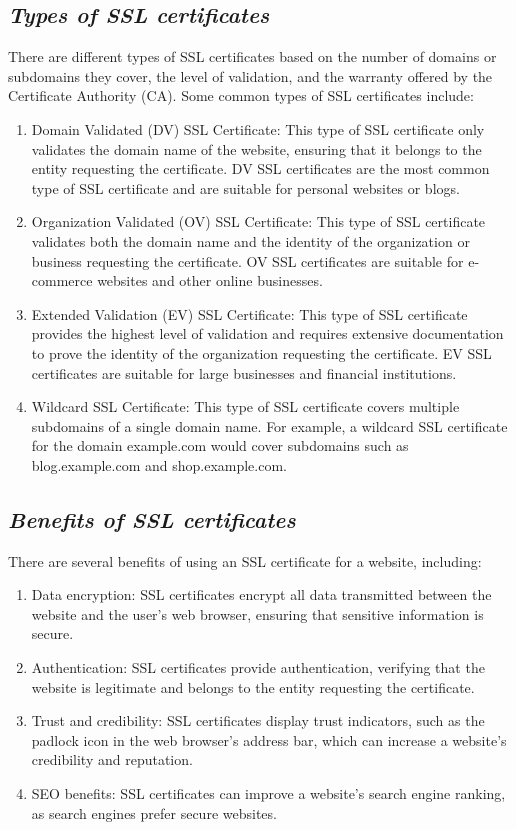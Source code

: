 \documentclass{article}
\begin{document}
\subsection{\textit{Types of SSL certificates}}
There are different types of SSL certificates based on the number of domains or subdomains they cover, the level of validation, and the warranty offered by the Certificate Authority (CA). Some common types of SSL certificates include:
\begin{enumerate}
	\item Domain Validated (DV) SSL Certificate: This type of SSL certificate only validates the domain name of the website, ensuring that it belongs to the entity requesting the certificate. DV SSL certificates are the most common type of SSL certificate and are suitable for personal websites or blogs.
	\item Organization Validated (OV) SSL Certificate: This type of SSL certificate validates both the domain name and the identity of the organization or business requesting the certificate. OV SSL certificates are suitable for e-commerce websites and other online businesses.
	\item Extended Validation (EV) SSL Certificate: This type of SSL certificate provides the highest level of validation and requires extensive documentation to prove the identity of the organization requesting the certificate. EV SSL certificates are suitable for large businesses and financial institutions.
	\item Wildcard SSL Certificate: This type of SSL certificate covers multiple subdomains of a single domain name. For example, a wildcard SSL certificate for the domain example.com would cover subdomains such as blog.example.com and shop.example.com.
	
\end{enumerate}
\subsection{\textit{Benefits of SSL certificates}}
There are several benefits of using an SSL certificate for a website, including:
\begin{enumerate}
	\item Data encryption: SSL certificates encrypt all data transmitted between the website and the user's web browser, ensuring that sensitive information is secure.
	\item Authentication: SSL certificates provide authentication, verifying that the website is legitimate and belongs to the entity requesting the certificate.
	\item Trust and credibility: SSL certificates display trust indicators, such as the padlock icon in the web browser's address bar, which can increase a website's credibility and reputation.
	\item SEO benefits: SSL certificates can improve a website's search engine ranking, as search engines prefer secure websites.
	
\end{enumerate}
\end{document}
